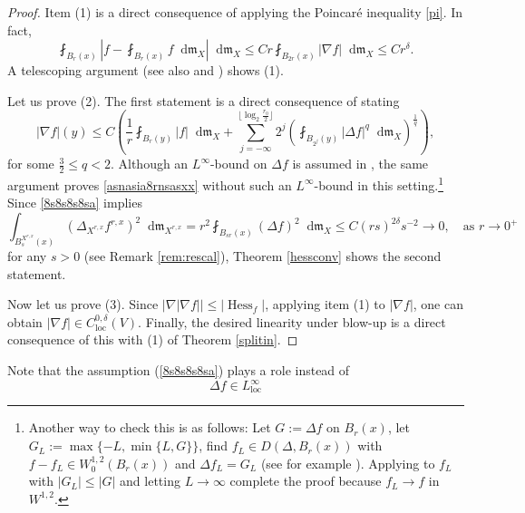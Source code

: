 \documentclass[11pt,reqno]{amsart}
\theoremstyle{definition}
\numberwithin{equation}{section}
\newcommand{\di}{\mathop{}\!\mathrm{d}}
\newcommand{\meas}{\mathfrak{m}}
\DeclareMathOperator{\Hess}{Hess}
\DeclareMathOperator{\loc}{loc}
\begin{document}
\begin{proof}
Item (1) is a direct consequence of applying the Poincar\'e inequality \eqref{pi}. In fact, 
\begin{equation}
    \fint_{B_r(x)}\left| f-\fint_{B_r(x)}f\di \meas_X\right|\di \meas_X \le Cr \fint_{B_{2r}(x)}|\nabla f|\di \meas_X \le Cr^{\delta}.
\end{equation}
A telescoping argument 
(see also \cite[page 452]{Chee} and \cite[Theorem 5.1]{HK}) shows (1).

Let us prove (2). 
The first statement is a direct consequence of \cite[Theorem 3.1]{JKY} stating
\begin{equation}\label{asnasia8rnsasxx}
    |\nabla f|(y) \le C \left( \frac{1}{r}\fint_{B_r(y)}|f|\di \meas_X+\sum_{j=-\infty}^{\lfloor \log_2\frac{r_0}{2}\rfloor}2^j\left( \fint_{B_{2^j}(y)}|\Delta f|^q\di \meas_X\right)^{\frac{1}{q}}\right),
\end{equation}
for some $\frac{3}{2}\le q <2$. Although an $L^{\infty}$-bound on $\Delta f$ is assumed in \cite{JKY}, the same argument proves \eqref{asnasia8rnsasxx} without such an $L^{\infty}$-bound in this setting.\footnote{Another way to check this is as follows: Let $G:=\Delta f$ on $B_r(x)$, let $G_L:=\max\{-L, \min\{L, G\}\}$, find $f_L \in D(\Delta, B_r(x))$ with $f-f_L \in W^{1,2}_0(B_r(x))$ and $\Delta f_L=G_L$ (see for example \cite[Lemma 4.7]{AmbrosioHonda2}). Applying \cite[Theorem 3.1]{JKY} to $f_L$ with $|G_L| \le |G|$ and letting $L \to \infty$ complete the proof because $f_L \to f$ in $W^{1,2}$.} 
Since \eqref{8s8s8s8sa} implies 
\begin{equation}\label{eq:lapbdzero}
    \int_{B_s^{X^{r,x}}(x)}(\Delta_{X^{r,x}}f^{r,x})^2\di \meas_{X^{r,x}} =r^2\fint_{B_{sr}(x)}(\Delta f)^2\di \meas_X \le C(rs)^{2\delta} s^{-2}\to 0, \quad \text{as $r \to 0^+$}
\end{equation}
for any $s>0$ (see Remark \ref{rem:rescal}), 
Theorem \ref{hessconv} shows the second statement.

 

Now let us prove (3). Since 
$ |\nabla |\nabla f|| \le |\Hess_f|$,
applying item (1) to $|\nabla f|$,
one can obtain $|\nabla f| \in C^{0,\delta}_{\loc}(V)$. 
Finally, the desired linearity under blow-up is a direct consequence of this with (1) of Theorem \ref{splitin}. 
\end{proof}
    Note that 
     the assumption (\ref{8s8s8s8sa}) plays a role instead of 
        \begin{equation}\label{asa9sarjsansf}
            \Delta f \in L^{\infty}_{\loc}
        \end{equation}
\end{document}
